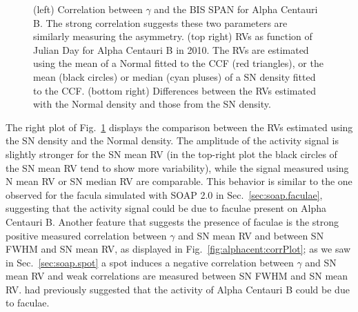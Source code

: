 \documentclass{aa}
\begin{document}
\begin{figure}[htbp]
\begin{center}
   \caption{(left) Correlation between $\gamma$ and the BIS SPAN for Alpha Centauri B. The strong correlation suggests these two parameters are similarly measuring the asymmetry. (top right) RVs as function of Julian Day for Alpha Centauri B in 2010. The RVs are estimated using the mean of a Normal fitted to the CCF (red triangles), or the mean (black circles) or median (cyan pluses) of a SN density fitted to the CCF. (bottom right) Differences between the RVs estimated with the Normal density and those from the SN density.}
   \label{fig:alphacent:corr.gamma}
\end{center}
\end{figure}
%

The right plot of Fig.~\ref{fig:alphacent:corr.gamma} displays the comparison between the RVs estimated using the SN density and the Normal density. 
The amplitude of the activity signal is slightly stronger for the SN mean RV (in the top-right plot the black circles of the SN mean RV tend to show more variability), while the signal measured using N mean RV or SN median RV are comparable. 
%
This behavior is similar to the one observed for the facula simulated with SOAP 2.0 in Sec.~\ref{sec:soap.faculae}, suggesting that the activity signal could be due to faculae present on Alpha Centauri B.  
%
Another feature that suggests the presence of faculae is the strong positive measured correlation between $\gamma$ and SN mean RV and  between SN FWHM and SN mean RV, as displayed in Fig.~\ref{fig:alphacent:corrPlot}; 
as we saw in Sec.~\ref{sec:soap.spot} a spot induces a negative correlation between $\gamma$ and SN mean RV and weak correlations are measured between SN FWHM and SN mean RV.
\citet{Dumusque-2014c} had previously suggested that the activity of Alpha Centauri B could be due to faculae.
%
\end{document}
